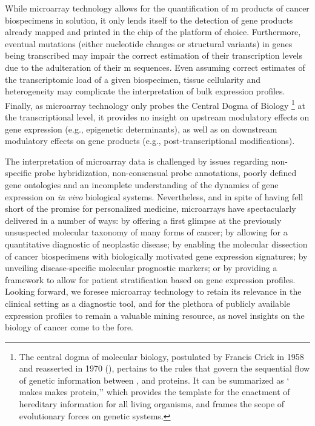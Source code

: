 While microarray technology allows for the quantification of m
products of cancer biospecimens in solution, it only lends itself to the
detection of gene products already mapped and printed in the chip of the
platform of choice.  Furthermore, eventual mutations (either nucleotide changes
or structural variants) in genes being transcribed may impair the correct
estimation of their transcription levels due to the adulteration of their
m sequences.  Even assuming correct estimates of the
transcriptomic load of a given biospecimen, tissue cellularity and heterogeneity
may complicate the interpretation of bulk expression profiles.  Finally, as
microarray technology only probes the Central Dogma of Biology \footnote{The
  central dogma of molecular biology, postulated by Francis Crick in 1958 and
  reasserted in 1970 (\citealp{crick_protein_1958,crick_central_1970}), pertains
  to the rules that govern the sequential flow of genetic information between
  ,  and proteins.  It can be summarized as
  ` makes  makes protein,'' which provides the
  template for the enactment of hereditary information for all living organisms,
  and frames the scope of evolutionary forces on genetic systems.} at the
transcriptional level, it provides no insight on upstream modulatory effects on
gene expression (e.g., epigenetic determinants), as well as on downstream
modulatory effects on gene products (e.g., post-transcriptional modifications).

The interpretation of microarray data is challenged by issues regarding
non-specific probe hybridization, non-consensual probe annotations, poorly
defined gene ontologies and an incomplete understanding of the dynamics of gene
expression on \emph{in vivo} biological systems.  Nevertheless, and in spite of
having fell short of the promise for personalized medicine, microarrays have
spectacularly delivered in a number of ways: by offering a first glimpse at the
previously unsuspected molecular taxonomy of many forms of cancer; by allowing
for a quantitative diagnostic of neoplastic disease; by enabling the molecular
dissection of cancer biospecimens with biologically motivated gene expression
signatures; by unveiling disease-specific molecular prognostic markers; or by
providing a framework to allow for patient stratification based on gene
expression profiles.  Looking forward, we foresee microarray technology to
retain its relevance in the clinical setting as a diagnostic tool, and for the
plethora of publicly available expression profiles to remain a valuable mining
resource, as novel insights on the biology of cancer come to the fore.

